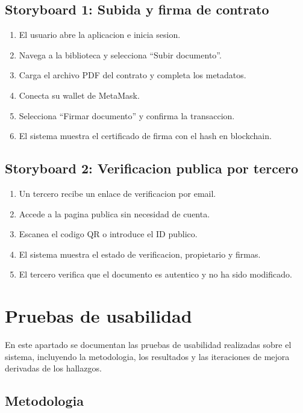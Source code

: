 \documentclass[11pt, a4paper]{article}
\begin{document}
\subsection{Storyboard 1: Subida y firma de contrato}

\begin{enumerate}
    \item El usuario abre la aplicacion e inicia sesion.
    \item Navega a la biblioteca y selecciona ``Subir documento''.
    \item Carga el archivo PDF del contrato y completa los metadatos.
    \item Conecta su wallet de MetaMask.
    \item Selecciona ``Firmar documento'' y confirma la transaccion.
    \item El sistema muestra el certificado de firma con el hash en blockchain.
\end{enumerate}

\subsection{Storyboard 2: Verificacion publica por tercero}

\begin{enumerate}
    \item Un tercero recibe un enlace de verificacion por email.
    \item Accede a la pagina publica sin necesidad de cuenta.
    \item Escanea el codigo QR o introduce el ID publico.
    \item El sistema muestra el estado de verificacion, propietario y firmas.
    \item El tercero verifica que el documento es autentico y no ha sido modificado.
\end{enumerate}

\section{Pruebas de usabilidad}

En este apartado se documentan las pruebas de usabilidad realizadas sobre el sistema, incluyendo la metodologia, los resultados y las iteraciones de mejora derivadas de los hallazgos.

\subsection{Metodologia}
\end{document}
